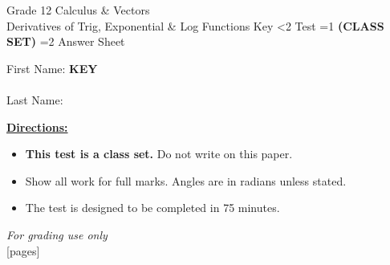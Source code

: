 \documentclass[addpoints]{exam}
\newcommand{\event}{Derivatives of Trig, Exponential \& Log Functions}
\newcommand{\tournament}{}
\def\type{0}
\begin{document}
\begin{center}
    {\huge Grade 12 Calculus \& Vectors \\ \event
    \ifprintanswers \space Key
    \else \space \ifnum\type<2 Test \fi \ifnum\type=1 \textbf{(CLASS SET)} \fi
          \ifnum\type=2 Answer Sheet \fi
    \fi \\ \vspace{3mm}\tournament\vspace{1mm}}
\end{center}

\vspace{.25\textheight}

\begin{center}
    First Name: \ifprintanswers
    \underline{\hspace{3.5cm}}\textbf{KEY}\underline{\hspace{5.5cm}}\\\vspace{5mm}
    \else \underline{\hspace{10cm}}\\ \vspace{5mm} \fi
    Last Name: \underline{\hspace{10cm}}\\ \vspace{5mm}
\end{center}

\noindent\textbf{\underline{Directions:}}
\begin{itemize}
    \ifnum\type=1 \item \textbf{This test is a class set.} Do not write on this paper. \fi
    \item Show all work for full marks. Angles are in radians unless stated.
    \item The test is designed to be completed in 75 minutes.
\end{itemize}
\begin{center}
\textit{For grading use only}\\
[pages]
\end{center}
\end{document}

